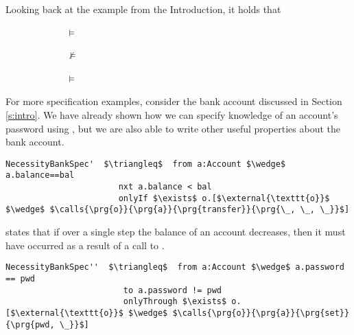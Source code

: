 Looking back at the example from the Introduction,   it holds that
\\
\strut $\hspace{1in}$  $\vDash$ 
 \\
\strut $\hspace{1in}$  $\not\vDash$ 
 \\
\strut $\hspace{1in}$  $\vDash$ 
 

 
For more specification examples, consider the
bank account discussed in Section \ref{s:intro}. We have already shown
how we can specify knowledge of an account's password using ,
but we are also able to write other useful properties about the bank account. 
 
\begin{lstlisting}[language = Chainmail, mathescape=true, frame=lines]
NecessityBankSpec'  $\triangleq$  from a:Account $\wedge$ a.balance==bal
                       nxt a.balance < bal
                       onlyIf $\exists$ o.[$\external{\texttt{o}}$ $\wedge$ $\calls{\prg{o}}{\prg{a}}{\prg{transfer}}{\prg{\_, \_, \_}}$]
\end{lstlisting}
 
 states that if over a single step the balance of an account decreases, then it must have occurred as 
a result of a call to .
 
\begin{lstlisting}[language = Chainmail, mathescape=true, frame=lines]
NecessityBankSpec''  $\triangleq$  from a:Account $\wedge$ a.password == pwd
                        to a.password != pwd
                        onlyThrough $\exists$ o.[$\external{\texttt{o}}$ $\wedge$ $\calls{\prg{o}}{\prg{a}}{\prg{set}}{\prg{pwd, \_}}$]
\end{lstlisting}
 

